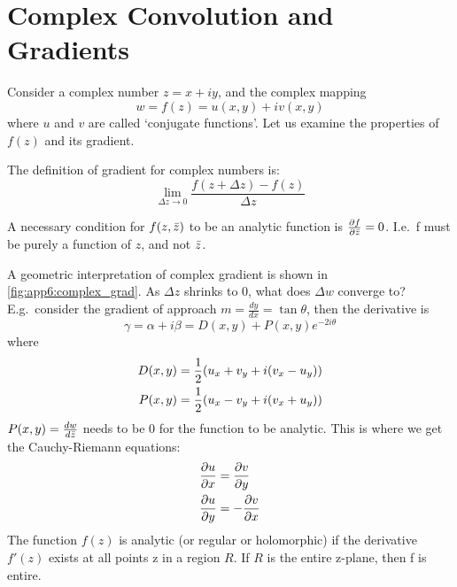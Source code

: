 \chapter{Complex Convolution and Gradients}\label{app:ch6:complex_backprop}
Consider a complex number $z=x+iy$, and the complex mapping 
\begin{equation}
w=f(z) = u(x,y) + iv(x,y)
\end{equation}
where $u$ and $v$ are called `conjugate functions'. Let us examine the
properties of $f(z)$ and its gradient. 

The definition of gradient for complex numbers is:
\begin{equation} 
  \lim_{\Delta z\to 0} \frac{f(z + \Delta z) - f(z)}{\Delta z}
\end{equation}

A necessary condition for $f(z,\bar{z})$ to be an analytic function is
$\frac{\partial f}{\partial \bar{z}}=0$. I.e.\ f must be purely a function of $z$, and not
$\bar{z}$.

A geometric interpretation of complex gradient is shown in
\autoref{fig:app6:complex_grad}.  As $\Delta z$ shrinks to 0, what does $\Delta w$
converge to? E.g.\ consider the gradient of approach $m=\frac{dy}{dx}=\tan
\theta$, then the derivative is
\begin{equation}
  \gamma = \alpha + i\beta = D(x,y) + P(x,y)e^{-2i\theta}
\end{equation}
where
\begin{align}
  D(x,y) & =  \frac{1}{2}(u_x + v_y + i(v_x - u_y)) \\
  P(x,y) & =  \frac{1}{2}(u_x - v_y + i(v_x + u_y))
\end{align}
$P(x,y)=\frac{dw}{d\bar{z}}$ needs to be 0 for the function to be analytic.
This is where we get the Cauchy-Riemann equations:
\begin{align}
  \frac{\partial u}{\partial x}&= \frac{\partial v}{\partial y} \\
  \frac{\partial u}{\partial y}&= -\frac{\partial v}{\partial x}
\end{align}
The function $f(z)$ is analytic (or regular or holomorphic) if the derivative 
$f'(z)$ exists at all points z in a region $R$. If $R$ is the entire z-plane,
then f is entire. 

\begin{figure}[!h]
	\centering
  
  \label{fig:app6:complex_grad}
\end{figure}

